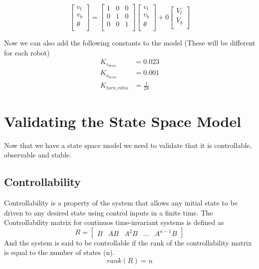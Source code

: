 \documentclass{scrartcl}
\begin{document}
\begin{equation}
    \begin{bmatrix}
        v_t    \\
        v_b    \\
        \theta \\
    \end{bmatrix}      = \begin{bmatrix}
        1 & 0 & 0 \\
        0 & 1 & 0 \\
        0 & 0 & 1 \\
    \end{bmatrix}\begin{bmatrix}
        v_t    \\
        v_b    \\
        \theta \\
    \end{bmatrix} + 0\begin{bmatrix}
        V_t \\
        V_b \\
    \end{bmatrix}
\end{equation}

Now we can also add the following constants to the model (These will be different for each robot)
\begin{align}
    K_{v_\mathit{drive}}   & = 0.023        \\
    K_{a_\mathit{drive}}   & = 0.001        \\
    K_\mathit{turn\_ratio} & = \frac{1}{28}
\end{align}

\newpage

\section{Validating the State Space Model}
Now that we have a state space model we need to validate that it is controllable, observable and stable.
\subsection{Controllability}
Controllability is a property of the system that allows any initial state to be driven to any desired state using control inputs in a finite time.
The Controllability matrix for continuos time-invariant systems is defined as
\begin{equation}
    \mathit{R} = \begin{bmatrix}
        B & AB & A^2B & \dots & A^{n-1}B
    \end{bmatrix}
\end{equation}
And the system is said to be controllable if the rank of the controllability matrix is equal to the number of states (n).
\begin{equation}
    \mathit{rank}(\mathit{R}) = n
\end{equation}
\end{document}
